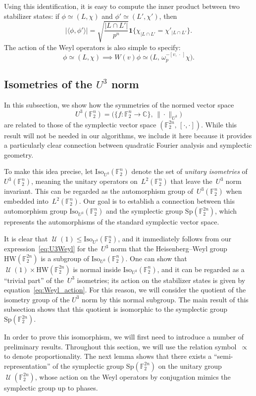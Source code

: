\documentclass[11pt]{amsart}
\newcommand{\C}{\mathbb{C}} %
\newcommand{\F}{\mathbb{F}} %
\newcommand{\HW}{\mathrm{HW}}
\newcommand{\Iso}{\mathrm{Iso}}
\newcommand{\Sp}{\mathrm{Sp}}
\newcommand{\one}{\mathbf{1}}
\DeclareMathOperator{\U}{\mathcal{U}}
\theoremstyle{plain}
\theoremstyle{definition}
\theoremstyle{remark}
\begin{document}
Using this identification, it is easy to compute the inner product between two stabilizer states:
if $\phi\simeq (L, \chi)$ and $\phi' \simeq (L', \chi')$, then
$$|\langle\phi, \phi'\rangle| = \sqrt{\frac{|L\cap L'|}{p^n}} \one\{\chi_{|L\cap L'} = \chi'_{|L\cap L'}\}.$$
The action of the Weyl operators is also simple to specify:
$$\phi\simeq (L, \chi) \implies W(v)\phi \simeq \big(L,\, \omega_p^{-[v,\,\cdot\,]} \chi\big).$$


\subsection{Isometries of the $U^3$ norm}

In this subsection, we show how the symmetries of the normed vector space
$$U^3(\F_2^n) = \big(\{f: \F_2^n \to \C\},\, \|\cdot\|_{U^3}\big)$$
are related to those of the symplectic vector space $(\F_2^{2n},\, [\cdot, \cdot])$.
While this result will not be needed in our algorithms, we include it here because it provides a particularly clear connection between quadratic Fourier analysis and symplectic geometry.

To make this idea precise, let $\Iso_{U^3}(\F_2^n)$ denote the set of \emph{unitary isometries} of~$U^3(\F_2^n)$, meaning the unitary operators on~$L^2(\F_2^n)$ that leave the~$U^3$ norm invariant.
This can be regarded as the automorphism group of~$U^3(\F_2^n)$ when embedded into~$L^2(\F_2^n)$.
Our goal is to establish a connection between this automorphism group $\Iso_{U^3}(\F_2^n)$ and the symplectic group $\Sp(\F_2^{2n})$, which represents the automorphisms of the standard symplectic vector space.

It is clear that $\U(1) \leq \Iso_{U^3}(\F_2^n)$, and it immediately follows from our expression~\eqref{eq:U3Weyl} for the~$U^3$ norm that the Heisenberg--Weyl group $\HW(\F_2^{2n})$ is a subgroup of $\Iso_{U^3}(\F_2^n)$.
One can show that $\U(1)\times \HW(\F_2^{2n})$ is normal inside $\Iso_{U^3}(\F_2^n)$, and it can be regarded as a ``trivial part'' of the~$U^3$ isometries;
its action on the stabilizer states is given by equation~\eqref{eq:Weyl_action}.
For this reason, we will consider the quotient of the isometry group of the $U^3$ norm by this normal subgroup.
The main result of this subsection shows that this quotient is isomorphic to the symplectic group $\Sp(\F_2^{2n})$.

In order to prove this isomorphism, we will first need to introduce a number of preliminary results.
Throughout this section, we will use the relation symbol~$\propto$ to denote proportionality. The next lemma shows that there exists a ``semi-representation'' of the symplectic group $\Sp(\F_2^{2n})$ on the unitary group $\U(\F_2^{2n})$, whose action on the Weyl operators by conjugation mimics the symplectic group up to phases.
\end{document}
